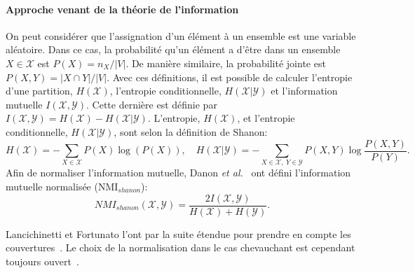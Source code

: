 \paragraph{Approche venant de la théorie de l'information}
On peut considérer que l'assignation d'un élément à un ensemble est une variable aléatoire.
Dans ce cas, la probabilité qu'un élément a d'être dans un ensemble $X \in \mathcal{X}$ est $P(X)= n_X/|V|$.
De manière similaire, la probabilité jointe est $P(X,Y) = |X \cap Y|/|V|$.
Avec ces définitions, il est possible de calculer l'entropie d'une partition, $H(\mathcal{X})$, l'entropie conditionnelle, $H(\mathcal{X}|\mathcal{Y})$ et l'information mutuelle $I(\mathcal{X},\mathcal{Y})$.
Cette dernière est définie par $I(\mathcal{X}, \mathcal{Y}) = H(\mathcal{X}) - H(\mathcal{X}|\mathcal{Y})$.
L'entropie, $H(\mathcal{X})$, et l'entropie conditionnelle, $H(\mathcal{X}|\mathcal{Y})$, sont selon la définition de Shanon: 
\begin{equation}
H(\mathcal{X}) = - \sum_{X \in \mathcal{X}} P(X)\log(P(X)),\quad H(\mathcal{X}|\mathcal{Y}) = -\sum_{X \in \mathcal{X},\ Y \in \mathcal{Y}} P(X, Y) \log \dfrac{P(X,Y)}{P(Y)}.
\end{equation}
Afin de normaliser l'information mutuelle, Danon \emph{et al.}~\cite{Danon2005a} ont défini l'information mutuelle normalisée (NMI$_{shanon}$):
\begin{equation}
 NMI_{shanon}(\mathcal{X},\mathcal{Y}) = \dfrac{2I(\mathcal{X},\mathcal{Y})}{H(\mathcal{X})+H(\mathcal{Y})}.
\end{equation}

Lancichinetti et Fortunato l'ont par la suite étendue pour prendre en compte les couvertures~\cite{Lancichinetti2009d}.
Le choix de la normalisation dans le cas chevauchant est cependant toujours ouvert~\cite{McDaid2011,Zhang2015c}.



